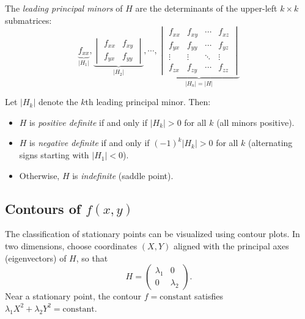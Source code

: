 \documentclass[a4paper]{article}
\begin{document}
\begin{defi}
  The \emph{leading principal minors} of $H$ are the determinants of the upper-left $k \times k$ submatrices:
  \[
    \underbrace{f_{xx}}_{|H_1|},
    \underbrace{
      \begin{vmatrix}
        f_{xx} & f_{xy}\\
        f_{yx} & f_{yy}
      \end{vmatrix}}_{|H_2|},\cdots,
    \underbrace{\begin{vmatrix}
      f_{xx} & f_{xy} & \cdots & f_{xz}\\
      f_{yx} & f_{yy} & \cdots & f_{yz}\\
      \vdots & \vdots & \ddots & \vdots\\
      f_{zx} & f_{zy} & \cdots & f_{zz}
    \end{vmatrix}}_{|H_n| = |H|}
  \]
\end{defi}

\begin{prop}
  Let $|H_k|$ denote the $k$th leading principal minor. Then:
  \begin{itemize}
    \item $H$ is \emph{positive definite} if and only if $|H_k| > 0$ for all $k$ (all minors positive).
    \item $H$ is \emph{negative definite} if and only if $(-1)^k |H_k| > 0$ for all $k$ (alternating signs starting with $|H_1| < 0$).
    \item Otherwise, $H$ is \emph{indefinite} (saddle point).
  \end{itemize}
\end{prop}

\subsection{Contours of \texorpdfstring{$f(x, y)$}{f(x, y)}}
\begin{remark}[Setup]
  The classification of stationary points can be visualized using contour plots. In two dimensions, choose coordinates $(X, Y)$ aligned with the principal axes (eigenvectors) of $H$, so that
  \[
    H = \begin{pmatrix} \lambda_1 & 0\\ 0 & \lambda_2 \end{pmatrix}.
  \]
  Near a stationary point, the contour $f = \text{constant}$ satisfies $\lambda_1 X^2 + \lambda_2 Y^2 = \text{constant}$.
\end{remark}
\end{document}
